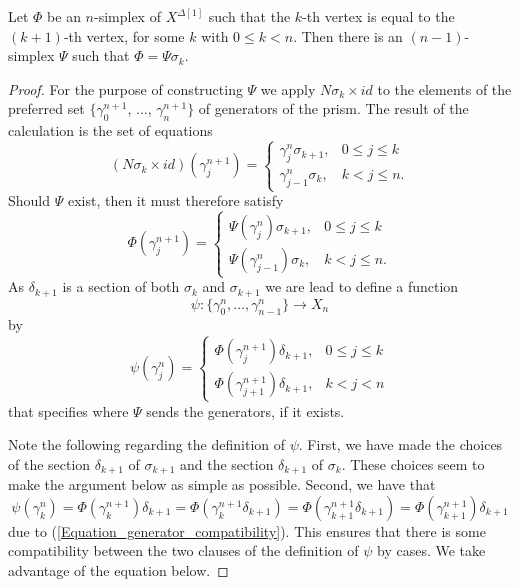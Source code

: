 \begin{lemma}\label{lem:part2_standard_1_simplex_as_exponent}
Let $\Phi$ be an $n$-simplex of $X^{\Delta [1]}$ such that the $k$-th vertex is equal to the $(k+1)$-th vertex, for some $k$ with $0\leq k<n$. Then there is an $(n-1)$-simplex $\Psi$ such that $\Phi =\Psi \sigma _k$.
\end{lemma}
\begin{proof}
For the purpose of constructing $\Psi$ we apply $N\sigma _k \times id$ to the elements of the preferred set $\{ \gamma ^{n+1}_0$, $\dots$, $\gamma ^{n+1}_n\}$ of generators of the prism. The result of the calculation is the set of equations
\begin{displaymath}
(N\sigma _k\times id)(\gamma ^{n+1}_j)=
\begin{cases}
\gamma ^n_j\sigma _{k+1}, & 0 \leq j \leq k \\ 
\gamma ^n_{j-1}\sigma _k, & k < j \leq n.
\end{cases}
\end{displaymath}
Should $\Psi$ exist, then it must therefore satisfy
\begin{displaymath}
\Phi (\gamma ^{n+1}_j)=
\begin{cases}
\Psi (\gamma ^n_j)\sigma _{k+1}, & 0 \leq j \leq k \\ 
\Psi (\gamma ^n_{j-1})\sigma _k, & k < j \leq n.
\end{cases}
\end{displaymath}
As $\delta _{k+1}$ is a section of both $\sigma _k$ and $\sigma _{k+1}$ we are lead to define a function
\[\psi :\{ \gamma ^n_0,\dots ,\gamma ^n_{n-1}\} \to X_n\]
by
\begin{displaymath}
\psi (\gamma ^n_j)=
\begin{cases}
\Phi (\gamma ^{n+1}_j)\delta _{k+1}, & 0\leq j\leq k \\ 
\Phi (\gamma ^{n+1}_{j+1})\delta _{k+1}, & k<j<n
\end{cases}
\end{displaymath}
that specifies where $\Psi$ sends the generators, if it exists.

Note the following regarding the definition of $\psi$. First, we have made the choices of the section $\delta _{k+1}$ of $\sigma _{k+1}$ and the section $\delta _{k+1}$ of $\sigma _k$. These choices seem to make the argument below as simple as possible. Second, we have that
\[\psi (\gamma ^n_k)=\Phi (\gamma ^{n+1}_k)\delta _{k+1}=\Phi (\gamma ^{n+1}_k\delta _{k+1})=\Phi (\gamma ^{n+1}_{k+1}\delta _{k+1})=\Phi (\gamma ^{n+1}_{k+1})\delta _{k+1}\]
due to (\ref{Equation_generator_compatibility}). This ensures that there is some compatibility between the two clauses of the definition of $\psi$ by cases. We take advantage of the equation below.


\end{proof}
